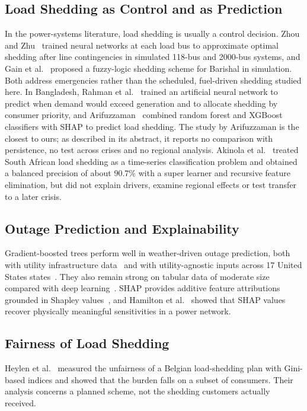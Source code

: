 \documentclass[conference]{IEEEtran}
\begin{document}
\subsection{Load Shedding as Control and as Prediction}
In the power-systems literature, load shedding is usually a control decision. Zhou and Zhu~\cite{zhou2024} trained neural networks at each load bus to approximate optimal shedding after line contingencies in simulated 118-bus and 2000-bus systems, and Gain et al.~\cite{gain2025} proposed a fuzzy-logic shedding scheme for Barishal in simulation. Both address emergencies rather than the scheduled, fuel-driven shedding studied here. In Bangladesh, Rahman et al.~\cite{rahman2016} trained an artificial neural network to predict when demand would exceed generation and to allocate shedding by consumer priority, and Arifuzzaman~\cite{arifuzzaman2026} combined random forest and XGBoost classifiers with SHAP to predict load shedding. The study by Arifuzzaman is the closest to ours; as described in its abstract, it reports no comparison with persistence, no test across crises and no regional analysis. Akinola et al.~\cite{akinola2024} treated South African load shedding as a time-series classification problem and obtained a balanced precision of about 90.7\% with a super learner and recursive feature elimination, but did not explain drivers, examine regional effects or test transfer to a later crisis.

\subsection{Outage Prediction and Explainability}
Gradient-boosted trees perform well in weather-driven outage prediction, both with utility infrastructure data~\cite{wanik2015} and with utility-agnostic inputs across 17 United States states~\cite{taylor2023}. They also remain strong on tabular data of moderate size compared with deep learning~\cite{grinsztajn2022}. SHAP provides additive feature attributions grounded in Shapley values~\cite{lundberg2017,lundberg2020}, and Hamilton et al.~\cite{hamilton2022} showed that SHAP values recover physically meaningful sensitivities in a power network.

\subsection{Fairness of Load Shedding}
Heylen et al.~\cite{heylen2018} measured the unfairness of a Belgian load-shedding plan with Gini-based indices and showed that the burden falls on a subset of consumers. Their analysis concerns a planned scheme, not the shedding customers actually received.
\end{document}
